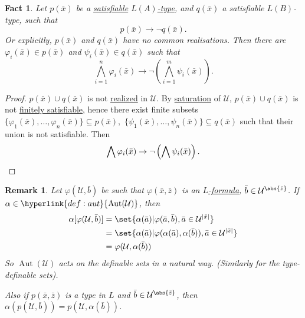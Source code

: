 \documentclass{article}
\DeclareMathOperator{\Aut}{Aut}
\newtheorem{nremark}[nthm]{Remark}
\newtheorem{nfact}[nthm]{Fact}
\begin{document}
\begin{nfact}\label{fact:7.2}
  Let $p(\bar{x})$ be a \hyperlink{def:type}{satisfiable} \hyperlink{def:typeparam}{$L(A)$-type}, and $q(\bar{x})$ a satisfiable $L(B)$-type, such that
  \begin{equation*}p(\bar{x})\to \lnot q(\bar{x}).\end{equation*}
  Or explicitly, $p(\bar{x})$ and $q(\bar{x})$ have no common realisations.
  Then there are $\varphi_i(\bar{x}) \in p(\bar{x})$ and $\psi_i(\bar{x}) \in q(\bar{x})$ such that
  \begin{equation*} \bigwedge_{i=1}^n\varphi_i(\bar{x})\to \lnot \left(\bigwedge_{i=1}^m\psi_i(\bar{x})\right).\end{equation*}
\end{nfact}
\begin{proof}
  $p(\bar{x})\cup q(\bar{x})$ is not \hyperlink{def:type}{realized} in $\mathcal{U}$.
  By \hyperlink{def:sat}{saturation} of $\mathcal{U}$, $p(\bar{x}) \cup q(\bar{x})$ is not \hyperlink{def:type}{finitely satisfiable},
  hence there exist finite subsets
  $\{\varphi_1(\bar{x}), \dotsc, \varphi_n(\bar{x})\} \subseteq p(\bar{x}),$
  $\{\psi_1(\bar{x}), \dotsc, \psi_n(\bar{x})\}\subseteq q(\bar{x})$
  such that their union is not satisfiable.
  Then
  \begin{equation*} \bigwedge \varphi_i(\bar{x}) \to \lnot\left(\bigwedge \psi_i(\bar{x}) \right). \qedhere \end{equation*}
\end{proof}
\begin{nremark}\label{rem:7.3}
  Let $ \varphi(\mathcal{U},\bar{b}) $ be such that $\varphi(\bar{x},\bar{z})$ is an \hyperlink{def:form}{$L$-formula}, $\bar{b}\in \mathcal{U}^{\abs{\bar{z}}} $.
  If $ \alpha\in\hyperlink{def:aut}{\Aut(\mathcal{U})} $, then
  \begin{align*}
    \alpha[\varphi(\mathcal{U},\bar{b})] &= \set{\alpha(\bar{a})|\varphi(\bar{a},\bar{b}), \bar{a} \in \mathcal{U}^{|\bar{x}|}}\\
                                         &= \set{\alpha(\bar{a})|\varphi(\alpha(\bar{a}),\alpha(\bar{b})), \bar{a} \in \mathcal{U}^{|\bar{x}|}}\\
                                         &= \varphi(\mathcal{U},\alpha(\bar{b}))
  \end{align*}
  So $\Aut(\mathcal{U})$ acts on the definable sets in a natural way. (Similarly for the type-definable sets).
  
  Also if $p(\bar x, \bar z)$ is a type in $L$ and $\bar b \in \mathcal{U}^{\abs{\bar z}}$, then $\alpha(p(\mathcal{U}, \bar b)) = p(\mathcal{U}, \alpha(\bar b))$.
\end{nremark}
\end{document}
